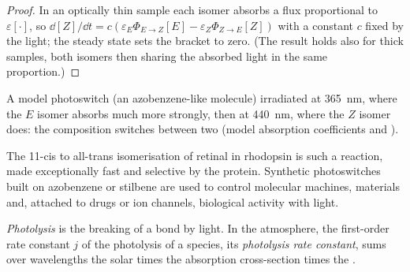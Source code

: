 \begin{proof}
In an optically thin sample each isomer absorbs a flux proportional to $\varepsilon[\cdot]$, so
$\dd[Z]/\dd t = c(\varepsilon_E\Phi_{E\to Z}[E] - \varepsilon_Z\Phi_{Z\to E}[Z])$ with a constant $c$ fixed by the light;
the steady state sets the bracket to zero. (The result holds also for thick
samples, both isomers then sharing the absorbed light in the same proportion.)
\end{proof}

\begin{omfigure}

{\small A model photoswitch (an azobenzene-like molecule) irradiated at \qty{365}{nm}, where
the $E$ isomer absorbs much more strongly, then at \qty{440}{nm}, where the $Z$ isomer does:
the composition switches between two  (model
absorption coefficients and ).}
\end{omfigure}

The 11-cis to all-trans isomerisation of retinal in rhodopsin is such a
reaction, made exceptionally fast and selective by the protein. Synthetic
photoswitches built on azobenzene or stilbene are used to control molecular
machines, materials and, attached to drugs or ion channels, biological
activity with light.

\begin{definition}[Photolysis]\label{def:b3:photochemistry:photolysis}
\emph{Photolysis} is the breaking of a bond by light. In the
atmosphere, the first-order rate constant $j$ of the photolysis of a species, its
\emph{photolysis rate constant}, sums over
wavelengths the solar  times the absorption cross-section times the
.
\end{definition}

